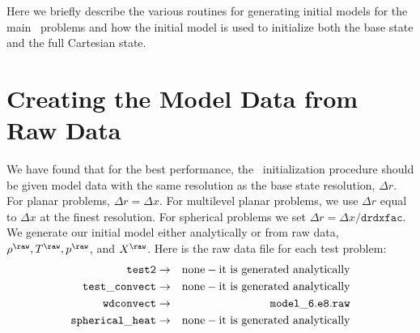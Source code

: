 Here we briefly describe the various routines for generating initial models
for the main \maestro\ problems and how the initial model is used to initialize
both the base state and the full Cartesian state.


\section{Creating the Model Data from Raw Data}\label{Sec:Creating the Model Data from Raw Data}
\label{sec:initial_models_main}

We have found that for the best performance, the \maestro\
initialization procedure should be given model data with the same
resolution as the base state resolution, $\Delta r$.  For planar
problems, $\Delta r = \Delta x$.  For multilevel planar problems, we
use $\Delta r$ equal to $\Delta x$ at the finest resolution.  For
spherical problems we set $\Delta r = \Delta x/\mathtt{drdxfac}$.  We
generate our initial model either analytically or from raw data,
$\rho^{\raw}, T^{\raw}, p^{\raw}$, and $X^{\raw}$.  Here is the raw
data file for each test problem:
\begin{eqnarray}
{\tt test2} & \rightarrow & \mathrm{none-it~ is~ generated~ analytically} \nonumber \nonumber \\
{\tt test\_convect} & \rightarrow & \mathrm{none-it~ is~ generated~ analytically} \nonumber \nonumber \\
{\tt wdconvect} & \rightarrow & {\tt model\_6.e8.raw} \nonumber \\
{\tt spherical\_heat} & \rightarrow & \mathrm{none-it~ is~ generated~ analytically} \nonumber \\
\end{eqnarray}

